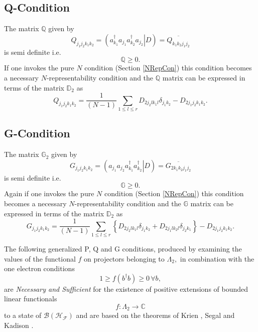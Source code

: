 \documentclass[aps,preprint,amsfonts,amssymb,showpacs,showkeys]{revtex4}%
\begin{document}
\subsection{Q-Condition}

The matrix $\mathbb{Q}$ given by
\begin{equation}
Q_{j_{1}j_{2}k_{1}k_{2}}=\left(  \left.  a_{k_{1}}^{\dagger}a_{j_{1}}a_{k_{2}%
}^{\dagger}a_{j_{2}}\right\vert D\right)  =\overline{Q_{k_{1}k_{2}j_{1}j_{2}}}%
\end{equation}
is semi definite i.e.
\begin{equation}
\mathbb{Q}\geq0.
\end{equation}
If one invokes the pure $N$ condition (Section \ref{NRepCon}) this condition
becomes a necessary $N$-representability condition and the $\mathbb{Q}$ matrix
can be expressed in terms of the matrix $\mathbb{D}_{2}$ as
\begin{equation}
Q_{j_{1}j_{2}k_{1}k_{2}}=\frac{1}{\left(  N-1\right)  }\sum_{1\leq l\leq
r}D_{2j_{2}lk_{1}l}\delta_{j_{1}k_{2}}-D_{2j_{1}j_{2}k_{1}k_{2}}.
\end{equation}


\subsection{G-Condition}

The matrix $\mathbb{G}_{2}$ given by
\begin{equation}
G_{j_{1}j_{2}k_{1}k_{2}}=\left(  \left.  a_{j_{1}}a_{j_{2}}a_{k_{1}}^{\dagger
}a_{k_{2}}^{\dagger}\right\vert D\right)  =\overline{G_{2k_{1}k_{2}j_{1}j_{2}%
}}%
\end{equation}
is semi definite i.e.
\begin{equation}
\mathbb{G}\geq0.
\end{equation}
Again if one invokes the pure $N$ condition (Section \ref{NRepCon}) this
condition becomes a necessary $N$-representability condition and the
$\mathbb{G}$ matrix can be expressed in terms of the matrix $\mathbb{D}_{2}$
as
\begin{equation}
G_{j_{1}j_{2}k_{1}k_{2}}=\frac{1}{\left(  N-1\right)  }\sum_{1\leq l\leq
r}\left\{  D_{2j_{2}lk_{1}l}\delta_{j_{1}k_{2}}+D_{2j_{1}lk_{2}l}\delta
_{j_{2}k_{1}}\right\}  -D_{2j_{1}j_{2}k_{1}k_{2}}.
\end{equation}


The following generalized P, Q and G conditions, produced by examining the
values of the functional $f$ on projectors belonging to $\Lambda_{2},$ in
combination with the one electron conditions
\begin{equation}
1\geq f\left(  b^{\dagger}b\right)  \geq0\,\forall b,
\end{equation}
are \emph{Necessary and Sufficient }for the existence of positive extensions
of bounded linear functionals
\begin{equation}
f:\Lambda_{2}\rightarrow\mathbb{C}%
\end{equation}
to a state of $\mathcal{B}\left(  \mathcal{H}_{\mathcal{F}}\right)  $ and are
based on the theorems of Krien \cite{Krein}, Segal \cite{Segal} and Kadison
\cite{Kadison}.
\end{document}
